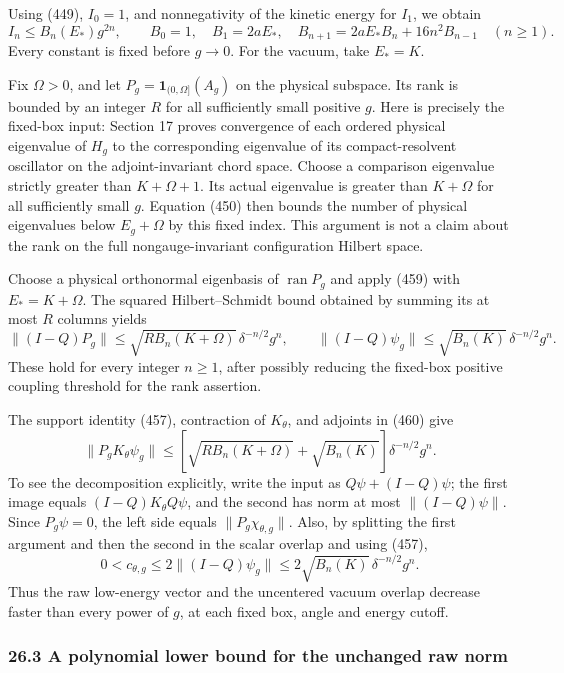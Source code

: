 \documentclass[
  11pt,
]{article}
\begin{document}
Using (449), \(I_0=1\), and nonnegativity of the kinetic energy for
\(I_1\), we obtain \[
 I_n\le B_n(E_*)g^{2n},\qquad
 B_0=1,\quad B_1=2aE_*,\quad
 B_{n+1}=2aE_*B_n+16n^2B_{n-1}\quad(n\ge1).
 \tag{459}
\] Every constant is fixed before \(g\to0\). For the vacuum, take
\(E_*=K\).

Fix \(\Omega>0\), and let \(P_g=\mathbf1_{(0,\Omega]}(A_g)\) on the
physical subspace. Its rank is bounded by an integer \(R\) for all
sufficiently small positive \(g\). Here is precisely the fixed-box
input: Section 17 proves convergence of each ordered physical eigenvalue
of \(H_g\) to the corresponding eigenvalue of its compact-resolvent
oscillator on the adjoint-invariant chord space. Choose a comparison
eigenvalue strictly greater than \(K+\Omega+1\). Its actual eigenvalue
is greater than \(K+\Omega\) for all sufficiently small \(g\). Equation
(450) then bounds the number of physical eigenvalues below
\(E_g+\Omega\) by this fixed index. This argument is not a claim about
the rank on the full nongauge-invariant configuration Hilbert space.

Choose a physical orthonormal eigenbasis of \(\operatorname{ran}P_g\)
and apply (459) with \(E_*=K+\Omega\). The squared Hilbert--Schmidt
bound obtained by summing its at most \(R\) columns yields \[
 \|(I-Q)P_g\|
 \le\sqrt{R B_n(K+\Omega)}\,\delta^{-n/2}g^n,\qquad
 \|(I-Q)\psi_g\|\le\sqrt{B_n(K)}\,\delta^{-n/2}g^n.
 \tag{460}
\] These hold for every integer \(n\ge1\), after possibly reducing the
fixed-box positive coupling threshold for the rank assertion.

The support identity (457), contraction of \(K_\theta\), and adjoints in
(460) give \[
 \|P_gK_\theta\psi_g\|
 \le\left[\sqrt{R B_n(K+\Omega)}+\sqrt{B_n(K)}\right]
                  \delta^{-n/2}g^n .
 \tag{461}
\] To see the decomposition explicitly, write the input as
\(Q\psi+(I-Q)\psi\); the first image equals \((I-Q)K_\theta Q\psi\), and
the second has norm at most \(\|(I-Q)\psi\|\). Since \(P_g\psi=0\), the
left side equals \(\|P_g\chi_{\theta,g}\|\). Also, by splitting the
first argument and then the second in the scalar overlap and using
(457), \[
 0<c_{\theta,g}\le2\|(I-Q)\psi_g\|
       \le2\sqrt{B_n(K)}\,\delta^{-n/2}g^n .
 \tag{462}
\] Thus the raw low-energy vector and the uncentered vacuum overlap
decrease faster than every power of \(g\), at each fixed box, angle and
energy cutoff.

\subsubsection{26.3 A polynomial lower bound for the unchanged raw
norm}\label{a-polynomial-lower-bound-for-the-unchanged-raw-norm}
\end{document}
